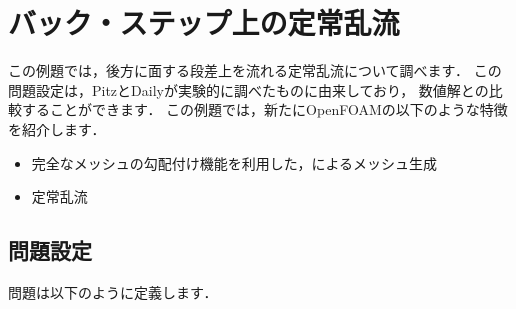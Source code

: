 \section{バック・ステップ上の定常乱流}
\label{sec:3.2}
この例題では，後方に面する段差上を流れる定常乱流について調べます．
この問題設定は，PitzとDailyが実験的に調べたものに由来しており，
数値解との比較することができます．
この例題では，新たにOpenFOAMの以下のような特徴を紹介します．
\begin{itemize}
 \item 完全なメッシュの勾配付け機能を利用した，によるメッシュ生成
 \item 定常乱流
\end{itemize}


\subsection{問題設定}
\label{ssec:3.2.1}
問題は以下のように定義します．
